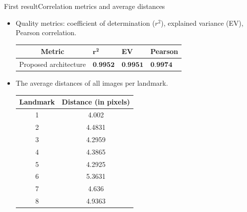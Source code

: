 \documentclass[10pt]{beamer}
\begin{document}
\begin{frame}{First result}{Correlation metrics and average distances}
	\begin{itemize}
		\item Quality metrics: coefficient of determination ($r^2$), explained variance (EV), Pearson correlation.
			\begin{table}[htbp]
				\centering
				\begin{tabular}{|c|p{1cm}|p{1cm}|p{1.5cm}|}
					\hline
					Metric & $\mathbf{r^{2}}$ & \textbf{EV} & \textbf{Pearson} \\ \hline
					Proposed architecture & $\textbf{0.9952}$ & $\textbf{0.9951}$ & $\textbf{0.9974}$ \\ \hline
				\end{tabular}
			\end{table}
		\pause
		\item The average distances of all images per landmark.
			\begin{table}[htbp]
				\centering
				\begin{tabular}{|c|c|}
					\hline
					\textbf{Landmark} & \textbf{Distance} (in pixels) \\ \hline
					1 & 4.002  \\ \hline
					2 & 4.4831 \\ \hline
					3 & 4.2959 \\ \hline
					4 & 4.3865 \\ \hline
					5 & 4.2925 \\ \hline
					6 & 5.3631 \\ \hline
					7 & 4.636 \\ \hline
					8 & 4.9363 \\ \hline
				\end{tabular}
			\end{table}
	\end{itemize}
\end{frame}

\end{document}
